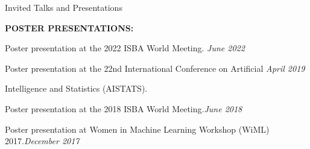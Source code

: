 \documentclass{resume} %
\begin{document}
\begin{rSection}{Invited Talks and Presentations}

\medskip
\textbf{POSTER PRESENTATIONS:}

Poster presentation at the 2022 ISBA World Meeting. \hfill {\em June 2022}


Poster presentation at the 22nd International Conference on Artificial  \hfill {\em April 2019}

\vspace{-0.1in}
Intelligence and Statistics (AISTATS).



Poster presentation at the 2018 ISBA World Meeting.\hfill {\em June 2018}


Poster presentation at Women in Machine Learning Workshop (WiML) 2017.\hfill {\em December 2017}

\end{rSection}


\end{document}
